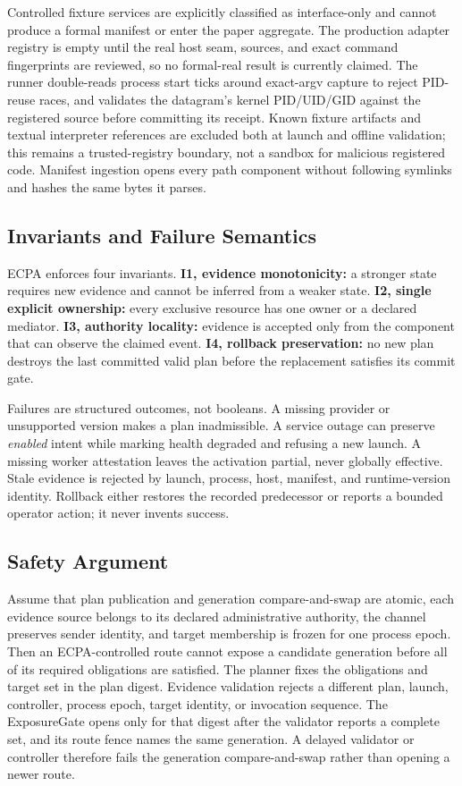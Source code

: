 \documentclass[letterpaper,twocolumn,10pt]{article}
\newcommand{\system}{\textsc{ECPA}\xspace}
\begin{document}
Controlled fixture services are explicitly classified as interface-only and
cannot produce a formal manifest or enter the paper aggregate.  The production
adapter registry is empty until the real host seam, sources, and exact command
fingerprints are reviewed, so no formal-real result is currently claimed.  The
runner double-reads process start ticks around exact-argv capture to reject
PID-reuse races, and validates the datagram's kernel PID/UID/GID against the
registered source before committing its receipt.
Known fixture artifacts and textual interpreter references are excluded both at
launch and offline validation; this remains a trusted-registry boundary, not a
sandbox for malicious registered code.  Manifest ingestion opens every path
component without following symlinks and hashes the same bytes it parses.

\subsection{Invariants and Failure Semantics}
\system enforces four invariants.  \textbf{I1, evidence monotonicity:} a stronger
state requires new evidence and cannot be inferred from a weaker state.
\textbf{I2, single explicit ownership:} every exclusive resource has one owner
or a declared mediator.  \textbf{I3, authority locality:} evidence is accepted
only from the component that can observe the claimed event.  \textbf{I4,
rollback preservation:} no new plan destroys the last committed valid plan
before the replacement satisfies its commit gate.

Failures are structured outcomes, not booleans.  A missing provider or
unsupported version makes a plan inadmissible.  A service outage can preserve
\emph{enabled} intent while marking health degraded and refusing a new launch.
A missing worker attestation leaves the activation partial, never globally
effective.  Stale evidence is rejected by launch, process, host, manifest, and
runtime-version identity.  Rollback either restores the recorded predecessor
or reports a bounded operator action; it never invents success.

\subsection{Safety Argument}
Assume that plan publication and generation compare-and-swap are atomic, each
evidence source belongs to its declared administrative authority, the channel
preserves sender identity, and target membership is frozen for one process
epoch.  Then an ECPA-controlled route
cannot expose a candidate generation before all of its required obligations
are satisfied.  The planner fixes the obligations and target set in the plan
digest.  Evidence validation rejects a different plan, launch, controller,
process epoch, target identity, or invocation sequence.  The ExposureGate
opens only for that digest after the validator reports a complete set, and its
route fence names the same generation.  A delayed validator or controller
therefore fails the generation compare-and-swap rather than opening a newer
route.
\end{document}
